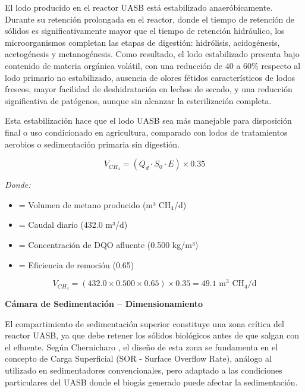 El lodo producido en el reactor UASB está estabilizado anaeróbicamente. Durante su retención prolongada en el reactor, donde el tiempo de retención de sólidos es significativamente mayor que el tiempo de retención hidráulico, los microorganismos completan las etapas de digestión: hidrólisis, acidogénesis, acetogénesis y metanogénesis. Como resultado, el lodo estabilizado presenta bajo contenido de materia orgánica volátil, con una reducción de 40 a 60\% respecto al lodo primario no estabilizado, ausencia de olores fétidos característicos de lodos frescos, mayor facilidad de deshidratación en lechos de secado, y una reducción significativa de patógenos, aunque sin alcanzar la esterilización completa.

Esta estabilización hace que el lodo UASB sea más manejable para disposición final o uso condicionado en agricultura, comparado con lodos de tratamientos aerobios o sedimentación primaria sin digestión.

\begin{equation}
V_{CH_4} = (Q_d \cdot S_0 \cdot E) \times 0.35
\end{equation}

\textit{Donde:}
\begin{itemize}[noitemsep,leftmargin=2em]
    \item[$V_{CH_4}$] = Volumen de metano producido (m³ CH$_4$/d)
    \item[$Q_d$] = Caudal diario (432.0 m³/d)
    \item[$S_0$] = Concentración de DQO afluente (0.500 kg/m³)
    \item[$E$] = Eficiencia de remoción (0.65)
\end{itemize}

\begin{equation}
V_{CH_4} = (432.0 \times 0.500 \times 0.65) \times 0.35 = 49.1 \text{ m}^3 \text{ CH}_4\text{/d}
\end{equation}

\textbf{Cámara de Sedimentación -- Dimensionamiento}

El compartimiento de sedimentación superior constituye una zona crítica del reactor UASB, ya que debe retener los sólidos biológicos antes de que salgan con el efluente. Según Chernicharo \cite{chernicharo2007}, el diseño de esta zona se fundamenta en el concepto de Carga Superficial (SOR - Surface Overflow Rate), análogo al utilizado en sedimentadores convencionales, pero adaptado a las condiciones particulares del UASB donde el biogás generado puede afectar la sedimentación.

